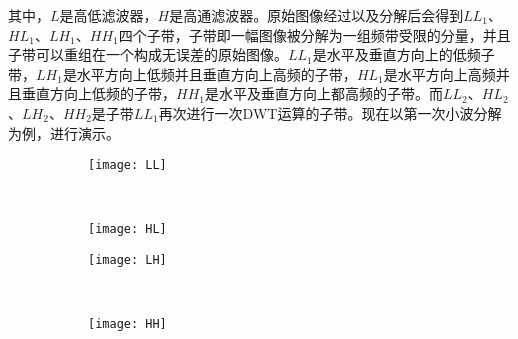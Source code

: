 
其中，$L$是高低滤波器，$H$是高通滤波器。原始图像经过以及分解后会得到$LL_1$、$HL_1$、$LH_1$、$HH_1$四个子带，子带即一幅图像被分解为一组频带受限的分量，并且子带可以重组在一个构成无误差的原始图像。$LL_1$是水平及垂直方向上的低频子带，$LH_1$是水平方向上低频并且垂直方向上高频的子带，$HL_1$是水平方向上高频并且垂直方向上低频的子带，$HH_1$是水平及垂直方向上都高频的子带。而$LL_2$、$HL_2$、$LH_2$、$HH_2$是子带$LL_1$再次进行一次DWT运算的子带。现在以第一次小波分解为例，进行演示。

\begin{figure}[htb!]
    \centering
    \begin{subfigure}[b]{0.5\textwidth}
      \texttt{[image: LL]}
      \caption{}
      \label{fig:oaspl_a}
    \end{subfigure}%
    ~%
    \begin{subfigure}[b]{0.5\textwidth}
      \texttt{[image: HL]}
      \caption{}
      \label{fig:oaspl_b}
    \end{subfigure}
    \begin{subfigure}[b]{0.5\textwidth}
      \texttt{[image: LH]}
      \caption{}
      \label{fig:oaspl_c}
    \end{subfigure}%
    ~%
    \begin{subfigure}[b]{0.5\textwidth}
      \texttt{[image: HH]}
      \caption{}
      \label{fig:oaspl_d}
    \end{subfigure}
    \label{fig:oaspl}
\end{figure}


